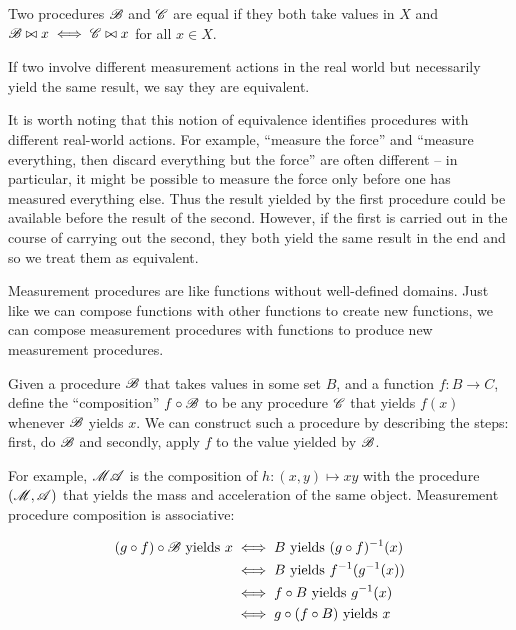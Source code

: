 \begin{definition}\label{def:equality}
Two procedures $\mathscr{B}$ and $\mathscr{C}$ are equal if they both take values in $X$ and $\mathscr{B}\bowtie x\iff \mathscr{C}\bowtie x$ for all $x\in X$.
\end{definition}

If two involve different measurement actions in the real world but necessarily yield the same result, we say they are equivalent.

It is worth noting that this notion of equivalence identifies procedures with different real-world actions. For example, ``measure the force'' and ``measure everything, then discard everything but the force'' are often different -- in particular, it might be possible to measure the force only before one has measured everything else. Thus the result yielded by the first procedure could be available before the result of the second. However, if the first is carried out in the course of carrying out the second, they both yield the same result in the end and so we treat them as equivalent. 

Measurement procedures are like functions without well-defined domains. Just like we can compose functions with other functions to create new functions, we can compose measurement procedures with functions to produce new measurement procedures.

\begin{definition}
Given a procedure $\mathscr{B}$ that takes values in some set $B$, and a function $f:B\to C$, define the ``composition'' $f\circ \mathscr{B}$ to be any procedure $\mathscr{C}$ that yields $f(x)$ whenever $\mathscr{B}$ yields $x$. We can construct such a procedure by describing the steps: first, do $\mathscr{B}$ and secondly, apply $f$ to the value yielded by $\mathscr{B}$.
\end{definition}

For example, $\mathscr{MA}$ is the composition of $h:(x,y)\mapsto xy$ with the procedure $(\mathscr{M},\mathscr{A})$ that yields the mass and acceleration of the same object. Measurement procedure composition is associative:

\begin{align}
    (g\circ f)\circ\mathscr{B}\text{ yields } x &\iff B\text{ yields } (g\circ f)^{-1}(x) \\
    &\iff B\text{ yields } f^{-1}(g^{-1}(x))\\
    &\iff f\circ B \text{ yields } g^{-1}(x)\\
    &\iff g\circ(f\circ B)\text{ yields } x
\end{align}


